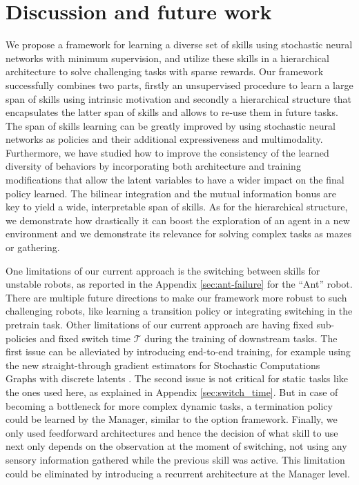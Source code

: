 \documentclass{article} %
\begin{document}
\section{Discussion and future work}
We propose a framework for learning a diverse set of skills using stochastic neural networks with minimum supervision, and utilize these skills in a hierarchical architecture to solve challenging tasks with sparse rewards. Our framework successfully combines two parts, firstly an unsupervised procedure to learn a large span of skills using intrinsic motivation and secondly a hierarchical structure that encapsulates the latter span of skills and allows to re-use them in future tasks. The span of skills learning can be greatly improved by using stochastic neural networks as policies and their additional expressiveness and multimodality. Furthermore, we have studied how to improve the consistency of the learned diversity of behaviors by incorporating both architecture and training modifications that allow the latent variables to have a wider impact on the final policy learned. The bilinear integration and the mutual information bonus are key to yield a wide, interpretable span of skills. As for the hierarchical structure, we demonstrate how drastically it can boost the exploration of an agent in a new environment and we demonstrate its relevance for solving complex tasks as mazes or gathering. 

One limitations of our current approach is the switching between skills for unstable robots, as reported in the Appendix \ref{sec:ant-failure} for the “Ant” robot. There are multiple future directions to make our framework more robust to such challenging robots, like learning a transition policy or integrating switching in the pretrain task. 
Other limitations of our current approach are having fixed sub-policies and fixed switch time $\mathcal{T}$ during the training of downstream tasks. The first issue can be alleviated by introducing end-to-end training, for example using the new straight-through gradient estimators for Stochastic Computations Graphs with discrete latents \citep{jang2016gumbel, maddison2016concrete}. The second issue is not critical for static tasks like the ones used here, as explained in Appendix \ref{sec:switch_time}. But in case of becoming a bottleneck for more complex dynamic tasks, a termination policy could be learned by the Manager, similar to the option framework.
Finally, we only used feedforward architectures and hence the decision of what skill to use next only depends on the observation at the moment of switching, not using any sensory information gathered while the previous skill was active. This limitation could be eliminated by introducing a recurrent architecture at the Manager level.
\end{document}
